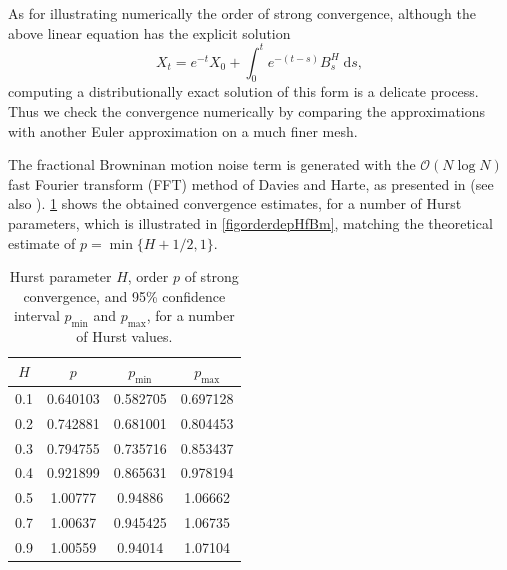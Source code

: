 \documentclass[reqno,12pt]{amsart}
\theoremstyle{plain} %
\theoremstyle{definition} %
\begin{document}
As for illustrating numerically the order of strong convergence, although the above linear equation has the explicit solution
\begin{equation}
    X_t = e^{-t}X_0 + \int_0^t e^{-(t-s)}B^H_s\;\mathrm{d}s,
\end{equation}
computing a distributionally exact solution of this form is a delicate process. Thus we check the convergence numerically by comparing the approximations with another Euler approximation on a much finer mesh.

The fractional Browninan motion noise term is generated with the $\mathcal{O}(N\log N)$ fast Fourier transform (FFT) method of Davies and Harte, as presented in \cite{DiekerMandjes2003} (see also \cite[Section 14.4]{HanKloeden2017}). \cref{taborderdepHfBm} shows the obtained convergence estimates, for a number of Hurst parameters, which is illustrated in \cref{figorderdepHfBm}, matching the theoretical estimate of $p = \min\{H+1/2, 1\}.$

\begin{table}
    \begin{center}
        \begin{tabular}[htb]{|c|c|c|c|}
            \hline $H$ & $p$ & $p_{\textrm{min}}$ & $p_{\textrm{max}}$ \\
            \hline \hline
            0.1  & 0.640103 &  0.582705 &  0.697128 \\
            0.2  & 0.742881 &  0.681001 &  0.804453 \\
            0.3  & 0.794755 &  0.735716 &  0.853437 \\
            0.4  & 0.921899 &  0.865631 &  0.978194 \\
            0.5  & 1.00777  &  0.94886  &  1.06662 \\
            0.7  & 1.00637  &  0.945425 &  1.06735 \\
            0.9  & 1.00559  &  0.94014  &  1.07104 \\
            \hline
        \end{tabular}
    \end{center}
    \bigskip

    \caption{Hurst parameter $H$, order $p$ of strong convergence, and 95\% confidence interval $p_{\textrm{min}}$ and $p_{\textrm{max}}$, for a number of Hurst values.}
    \label{taborderdepHfBm}
\end{table}
\end{document}
